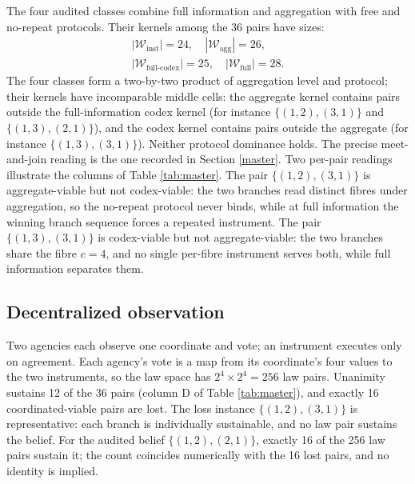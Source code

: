 \documentclass[10pt,twocolumn]{article}
\theoremstyle{definition}
\begin{document}
The four audited classes combine full information and aggregation with
free and no-repeat protocols. Their kernels among the 36 pairs have
sizes:
\begin{gather*}
|\mathcal{W}_{\mathrm{inst}}| = 24,\quad
|\mathcal{W}_{\mathrm{agg}}| = 26,\\
|\mathcal{W}_{\mathrm{full\text{-}codex}}| = 25,\quad
|\mathcal{W}_{\mathrm{full}}| = 28 .
\end{gather*}
The four classes form a two-by-two product of aggregation level and
protocol; their kernels have incomparable middle cells:
the aggregate kernel contains pairs outside the full-information codex
kernel (for instance \(\{(1,2),(3,1)\}\) and \(\{(1,3),(2,1)\}\)), and
the codex kernel contains pairs outside the aggregate (for instance
\(\{(1,3),(3,1)\}\)). Neither protocol dominance holds. The precise
meet-and-join reading is the one recorded in Section \ref{master}. Two
per-pair readings illustrate the columns of Table \ref{tab:master}. The
pair \(\{(1,2),(3,1)\}\) is aggregate-viable but not codex-viable: the
two branches read distinct fibres under aggregation, so the no-repeat
protocol never binds, while at full information the winning branch
sequence forces a repeated instrument. The pair \(\{(1,3),(3,1)\}\) is
codex-viable but not aggregate-viable: the two branches share the fibre
\(c = 4\), and no single per-fibre instrument serves both, while
full information separates them.

\subsection{Decentralized observation}\label{decentralized}

Two agencies each observe one coordinate and vote; an instrument
executes only on agreement. Each agency's vote is a map from its
coordinate's four values to the two instruments, so the law space has
\(2^{4} \times 2^{4} = 256\) law pairs. Unanimity sustains 12 of the
36 pairs (column D of Table \ref{tab:master}), and exactly 16
coordinated-viable pairs are lost. The loss instance
\(\{(1,2),(3,1)\}\) is representative: each branch is individually
sustainable, and no law pair sustains the belief. For the audited belief
\(\{(1,2),(2,1)\}\), exactly 16 of the 256 law pairs sustain it; the
count coincides numerically with the 16 lost pairs, and no identity is
implied.
\end{document}
